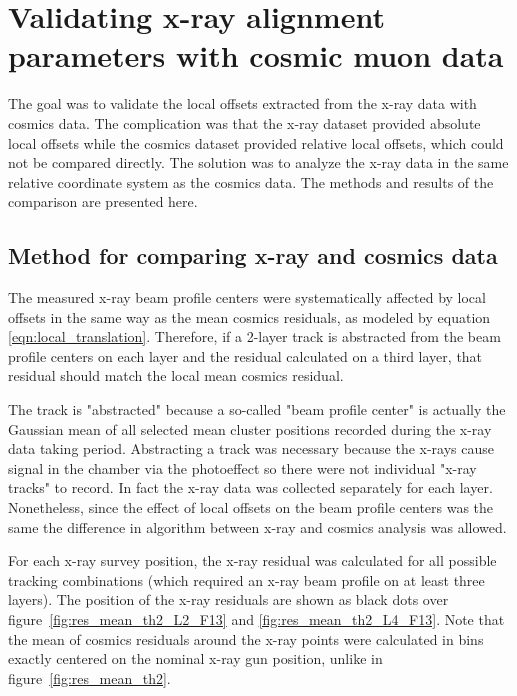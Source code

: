 
\chapter{Validating x-ray alignment parameters with cosmic muon data}
\label{chap:comparison}

The goal was to validate the local offsets extracted from the x-ray data with cosmics data. The complication was that the x-ray dataset provided absolute local offsets while the cosmics dataset provided relative local offsets, which could not be compared directly. The solution was to analyze the x-ray data in the same relative coordinate system as the cosmics data. The methods and results of the comparison are presented here.

\section{Method for comparing x-ray and cosmics data}

The measured x-ray beam profile centers were systematically affected by local offsets in the same way as the mean cosmics residuals, as modeled by equation \ref{eqn:local_translation}. Therefore, if a 2-layer track is abstracted from the beam profile centers on each layer and the residual calculated on a third layer, that residual should match the local mean cosmics residual. 

The track is "abstracted" because a so-called "beam profile center" is actually the Gaussian mean of all selected mean cluster positions recorded during the x-ray data taking period. Abstracting a track was necessary because the x-rays cause signal in the chamber via the photoeffect so there were not individual "x-ray tracks" to record. In fact the x-ray data was collected separately for each layer. Nonetheless, since the effect of local offsets on the beam profile centers was the same the difference in algorithm between x-ray and cosmics analysis was allowed. 

For each x-ray survey position, the x-ray residual was calculated for all possible tracking combinations (which required an x-ray beam profile on at least three layers). The position of the x-ray residuals are shown as black dots over figure~\ref{fig:res_mean_th2_L2_F13} and \ref{fig:res_mean_th2_L4_F13}. Note that the mean of cosmics residuals around the x-ray points were calculated in bins exactly centered on the nominal x-ray gun position, unlike in figure~\ref{fig:res_mean_th2}.

